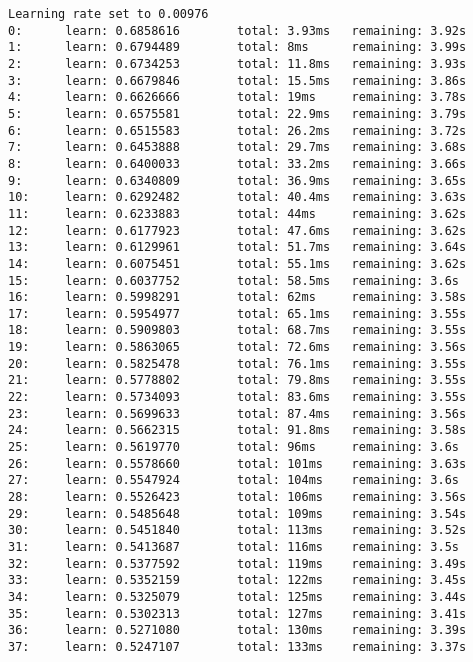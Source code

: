 \documentclass[11pt]{article}
\begin{document}
    \begin{Verbatim}[commandchars=\\\{\}]
Learning rate set to 0.00976
0:      learn: 0.6858616        total: 3.93ms   remaining: 3.92s
1:      learn: 0.6794489        total: 8ms      remaining: 3.99s
2:      learn: 0.6734253        total: 11.8ms   remaining: 3.93s
3:      learn: 0.6679846        total: 15.5ms   remaining: 3.86s
4:      learn: 0.6626666        total: 19ms     remaining: 3.78s
5:      learn: 0.6575581        total: 22.9ms   remaining: 3.79s
6:      learn: 0.6515583        total: 26.2ms   remaining: 3.72s
7:      learn: 0.6453888        total: 29.7ms   remaining: 3.68s
8:      learn: 0.6400033        total: 33.2ms   remaining: 3.66s
9:      learn: 0.6340809        total: 36.9ms   remaining: 3.65s
10:     learn: 0.6292482        total: 40.4ms   remaining: 3.63s
11:     learn: 0.6233883        total: 44ms     remaining: 3.62s
12:     learn: 0.6177923        total: 47.6ms   remaining: 3.62s
13:     learn: 0.6129961        total: 51.7ms   remaining: 3.64s
14:     learn: 0.6075451        total: 55.1ms   remaining: 3.62s
15:     learn: 0.6037752        total: 58.5ms   remaining: 3.6s
16:     learn: 0.5998291        total: 62ms     remaining: 3.58s
17:     learn: 0.5954977        total: 65.1ms   remaining: 3.55s
18:     learn: 0.5909803        total: 68.7ms   remaining: 3.55s
19:     learn: 0.5863065        total: 72.6ms   remaining: 3.56s
20:     learn: 0.5825478        total: 76.1ms   remaining: 3.55s
21:     learn: 0.5778802        total: 79.8ms   remaining: 3.55s
22:     learn: 0.5734093        total: 83.6ms   remaining: 3.55s
23:     learn: 0.5699633        total: 87.4ms   remaining: 3.56s
24:     learn: 0.5662315        total: 91.8ms   remaining: 3.58s
25:     learn: 0.5619770        total: 96ms     remaining: 3.6s
26:     learn: 0.5578660        total: 101ms    remaining: 3.63s
27:     learn: 0.5547924        total: 104ms    remaining: 3.6s
28:     learn: 0.5526423        total: 106ms    remaining: 3.56s
29:     learn: 0.5485648        total: 109ms    remaining: 3.54s
30:     learn: 0.5451840        total: 113ms    remaining: 3.52s
31:     learn: 0.5413687        total: 116ms    remaining: 3.5s
32:     learn: 0.5377592        total: 119ms    remaining: 3.49s
33:     learn: 0.5352159        total: 122ms    remaining: 3.45s
34:     learn: 0.5325079        total: 125ms    remaining: 3.44s
35:     learn: 0.5302313        total: 127ms    remaining: 3.41s
36:     learn: 0.5271080        total: 130ms    remaining: 3.39s
37:     learn: 0.5247107        total: 133ms    remaining: 3.37s

\end{Verbatim}
\end{document}
